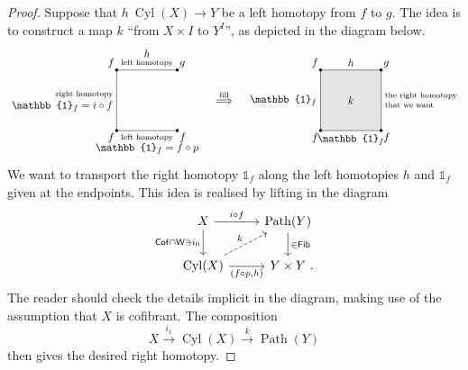 \begin{proof}
    Suppose that $h\:\operatorname{Cyl}(X)\to Y$ be a left homotopy from $f$ to $g$.
    The idea is to construct a map $k$ ``from $X\times I$ to $Y^I$'',
    as depicted in the diagram below.
    \[ \begin{tikzpicture}[baseline=(base.base)]
        \draw (2,2)--(0,2)--(0,0)--(2,0);
        \fill (0,0) circle (.05);
        \fill (0,2) circle (.05);
        \fill (2,0) circle (.05);
        \fill (2,2) circle (.05);
        
        \node[anchor=south east,inner sep=2pt] at (0,2) {$f$};
        \node[anchor=north east,inner sep=2pt] at (0,0) {$f$};
        \node[anchor=north west,inner sep=2pt] at (2,0) {$f$};
        \node[anchor=south west,inner sep=2pt] at (2,2) {$g$};
        \node[anchor=south] at (1,2) {\scriptsize left homotopy};
        \node[anchor=south] at (1,2.3) {$h$};
        \node[anchor=east] at (0,1.2) {\scriptsize right homotopy};
        \node[anchor=east] at (0,.8) {$\mathbb{1}_f=i \circ f$};
        \node[anchor=north] at (1,0) {\scriptsize left homotopy};
        \node[anchor=north] at (1,-.3) {$\mathbb{1}_f=f \circ p$};
        \node(base) at (0,1) {\phantom{0}};
    \end{tikzpicture} 
    \quad \overset{\text{fill}}{\Longrightarrow} \quad
    \begin{tikzpicture}[baseline=(base.base)]
        \fill[black!10] (0,0) rectangle (2,2);
        \draw (2,2)--(0,2)--(0,0)--(2,0)--cycle;
        \fill (0,0) circle (.05);
        \fill (0,2) circle (.05);
        \fill (2,0) circle (.05);
        \fill (2,2) circle (.05);
        
        \node[anchor=south east,inner sep=2pt] at (0,2) {$f$};
        \node[anchor=north east,inner sep=2pt] at (0,0) {$f$};
        \node[anchor=north west,inner sep=2pt] at (2,0) {$f$};
        \node[anchor=south west,inner sep=2pt] at (2,2) {$g$};
        \node[anchor=south] at (1,2) {$h$};
        \node[anchor=east] at (0,1) {$\mathbb{1}_f$};
        \node[anchor=north] at (1,0) {$\mathbb{1}_f$};
        \node[anchor=west] at (2,1.15) {\scriptsize the right homotopy};
        \node[anchor=west] at (2,.85) {\scriptsize that we want};
        \node at (1,1) {$k$};
        \node(base) at (0,1) {\phantom{0}};
    \end{tikzpicture} \]
    We want to transport the right homotopy $\mathbb{1}_f$
    along the left homotopies $h$ and $\mathbb{1}_f$ given at the endpoints.
    This idea is realised by lifting in the diagram
    \[ \begin{tikzcd}
        X \ar[d,"\cat{Cof}\cap\cat{W} \ni i_0"'] \ar[r,"i\circ f"] &
        \operatorname{Path}(Y) \ar[d,"\in\cat{Fib}"] \\
        \operatorname{Cyl}(X) \ar[r,"(f\circ p\comma h)"'] \ar[ur,dashed,"k"] &
        Y \times Y \rlap{\ .}
    \end{tikzcd} \]
    The reader should check the details implicit in the diagram,
    making use of the assumption that $X$ is cofibrant.
    The composition
    \[ X \xrightarrow{i_1} \operatorname{Cyl}(X) \xrightarrow{k} \operatorname{Path}(Y) \]
    then gives the desired right homotopy.


\end{proof}

